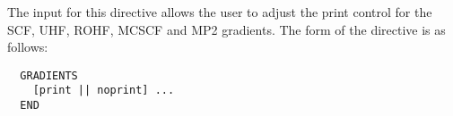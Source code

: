 \label{sec:scfgrad}


The input for this directive allows the user to adjust the print control
for the SCF, UHF, ROHF, MCSCF and MP2 gradients.  The
form of the directive is as follows:


\begin{verbatim}
  GRADIENTS 
    [print || noprint] ...
  END
\end{verbatim}







